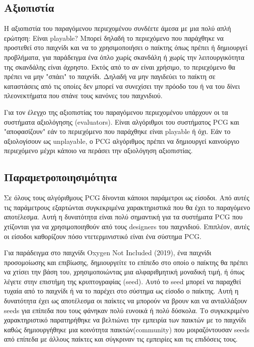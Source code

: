 \subsection{Aξιοπιστία} H αξιοπιστία του παραγόμενου περιεχομένου συνδέετε άμεσα με μια πολύ απλή ερώτηση: Είναι playable? Μπορεί δηλαδή το περιεχόμενο που παράχθηκε να προστεθεί στο παιχνίδι και να το χρησιμοποιήσει ο παίκτης όπως πρέπει ή δημιουργεί προβλήματα, για παράδειγμα ένα όπλο χωρίς σκανδάλη ή χωρίς την λειτουργικότητα της σκανδάλης είναι άχρηστο. Εκτός από το αν είναι χρήσιμο, το περιεχόμενο θα πρέπει να μην "σπάει" το παιχνίδι. Δηλαδή να μην παγιδεύει το παίκτη σε καταστάσεις από τις οποίες δεν μπορεί να συνεχίσει την πρόοδο του ή να του δίνει πλεονεκτήματα που σπάνε τους κανόνες του παιχνιδιού.
\par
Για τον έλεγχο της αξιοπιστίας του παραγόμενου περιεχομένου υπάρχουν οι τα συστήματα αξιολόγησης (evaluators). Eίναι αλγόριθμοι του συστήματος PCG και "αποφασίζουν" εάν το περιεχόμενο που παράχθηκε είναι playable ή όχι. Εάν το αξιολογίσουν ως unplayable, ο PCG αλγόριθμος πρέπει να δημιουργεί καινούργιο περιεχόμενο μέχρι κάποιο να περάσει την αξιολόγηση αξιοπιστίας.

\subsection{Παραμετροποιησιμότητα} Σε όλους τους αλγόριθμους PCG δίνονται κάποιοι παράμετροι ως είσοδοι. Από αυτές τις παράμετρους εξαρτώνται συγκεκριμένα χαρακτηριστικά που θα έχει το παραγόμενο αποτέλεσμα. Αυτή η δυνατότητα είναι πολύ σημαντική για τα συστήματα PCG που χτίζονται για να χρησιμοποιηθούν από τους designers του παιχνιδιού. Επιπλέον, αυτές οι είσοδοι καθορίζουν πόσο ντετερμινιστικό είναι ένα σύστημα PCG.
\par
Για παράδειγμα στο παιχνίδι Oxygen Not Included (2019), ένα παιχνίδι προσομοίωσης και επιβίωσης, δημιουργείτε το επίπεδο στο οποίο ο παίκτης θα πρέπει να χτίσει την βάση του, χρησιμοποιώντας μια αλφαριθμητική μοναδική τιμή, ή όπως λέγετε στην επιστήμη της κρυπτογραφίας (seed). Αυτό το seed μπορεί να παραχθεί τυχαία από το παιχνίδι ή να το παρέχει στο σύστημα ως είσοδο ο παίκτης. Αυτή η δυνατότητα έχει ως αποτέλεσμα οι παίκτες να μπορούν να βρουν και να ανταλλάξουν seeds για επίπεδα που τους φάνηκαν πολύ ευνοικά ή πολύ δύσκολα. Το συγκεκριμένο χαρακτηριστικό παρατηρήθηκε να βελτιώνει την εμπειρία των παικτών με το παιχνίδι καθώς δημιουργήθηκε μια κοινότητα παικτών(community) που μοιραζόντουσαν seeds από επίπεδα με άλλους παίκτες και σύγκριναν τις εμπειρίες και τις επιδόσεις τους. \cite{oxygennotincluded}

